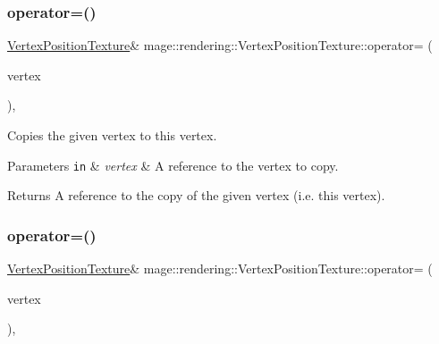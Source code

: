 \subsubsection{\texorpdfstring{operator=()}{operator=()}\hspace{0.1cm}{\footnotesize\ttfamily [1/2]}}
{\footnotesize\ttfamily \mbox{\hyperlink{structmage_1_1rendering_1_1_vertex_position_texture}{Vertex\+Position\+Texture}}\& mage\+::rendering\+::\+Vertex\+Position\+Texture\+::operator= (\begin{DoxyParamCaption}\item[{const \mbox{\hyperlink{structmage_1_1rendering_1_1_vertex_position_texture}{Vertex\+Position\+Texture}} \&}]{vertex }\end{DoxyParamCaption})\hspace{0.3cm}{\ttfamily [default]}, {\ttfamily [noexcept]}}

Copies the given vertex to this vertex.


\begin{DoxyParams}[1]{Parameters}
\mbox{\tt in}  & {\em vertex} & A reference to the vertex to copy. \\
\hline
\end{DoxyParams}
\begin{DoxyReturn}{Returns}
A reference to the copy of the given vertex (i.\+e. this vertex). 
\end{DoxyReturn}
\mbox{\label{structmage_1_1rendering_1_1_vertex_position_texture_abfdf8174794c7c3cbffc1843aee3aabd}} 
\subsubsection{\texorpdfstring{operator=()}{operator=()}\hspace{0.1cm}{\footnotesize\ttfamily [2/2]}}
{\footnotesize\ttfamily \mbox{\hyperlink{structmage_1_1rendering_1_1_vertex_position_texture}{Vertex\+Position\+Texture}}\& mage\+::rendering\+::\+Vertex\+Position\+Texture\+::operator= (\begin{DoxyParamCaption}\item[{\mbox{\hyperlink{structmage_1_1rendering_1_1_vertex_position_texture}{Vertex\+Position\+Texture}} \&\&}]{vertex }\end{DoxyParamCaption})\hspace{0.3cm}{\ttfamily [default]}, {\ttfamily [noexcept]}}


